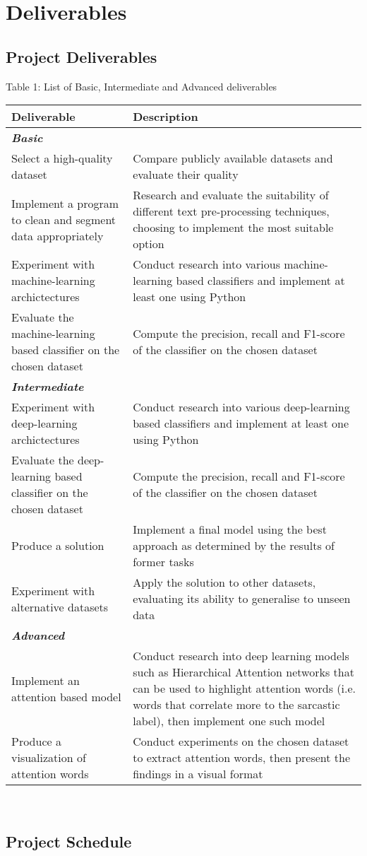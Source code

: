 \documentclass[12pt,a4paper]{article}
\begin{document}
\newpage

\section{Deliverables}
\subsection{Project Deliverables}
\begin{center}
	Table 1: List of Basic, Intermediate and Advanced deliverables
\end{center}
\begin{tabular}{p{5cm}p{10cm}}
	\hline
	\textbf{Deliverable} & \textbf{Description}\\
	\hline\hline
	\multicolumn{2}{l}{\textit{\textbf{Basic}}} \\
	\hline \hline
	Select a high-quality dataset   &  Compare publicly available datasets and evaluate their quality\\
	\hline
	Implement a program to clean and segment data appropriately   & Research and evaluate the suitability of different text pre-processing techniques, choosing to implement the most suitable option\\
	\hline
	Experiment with machine-learning archictectures & Conduct research into various machine-learning based classifiers and implement at least one using Python\\
	\hline
	Evaluate the machine-learning based classifier on the chosen dataset & Compute the precision, recall and F1-score of the classifier on the chosen dataset\\
	\hline \hline
	\multicolumn{2}{l}{\textit{\textbf{Intermediate}}} \\
	\hline \hline
	Experiment with deep-learning archictectures & Conduct research into various deep-learning based classifiers and implement at least one using Python\\
	\hline
	Evaluate the deep-learning based classifier on the chosen dataset & Compute the precision, recall and F1-score of the classifier on the chosen dataset\\
	\hline
	Produce a solution & Implement a final model using the best approach as determined by the results of former tasks\\
	\hline
	Experiment with alternative datasets & Apply the solution to other datasets, evaluating its ability to generalise to unseen data \\
	\hline \hline
	\multicolumn{2}{l}{\textit{\textbf{Advanced}}} \\
	\hline \hline	
	Implement an attention based model &   Conduct research into deep learning models such as Hierarchical Attention networks that can be used to highlight attention words (i.e. words that correlate more to the sarcastic label), then implement one such model\\
	\hline
	Produce a visualization of attention words & Conduct experiments on the chosen dataset to extract attention words, then present the findings in a visual format \\
	\hline
\end{tabular}\\
\subsection{Project Schedule}
\end{document}
